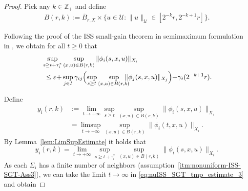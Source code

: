 \documentclass[twocolumn]{IEEEtran} %
\theoremstyle{definition}
\newcommand{\tm}{\times}%
\newcommand{\Uc}{\mathcal{U}}%
\newcommand{\ep}{\varepsilon}%
\newcommand{\Z}{\mathbb{Z}}%
\begin{document}
\begin{proof}
Pick any $k \in \Z_+$ and define 
\begin{eqnarray}
B(r,k) := \overline{B}_{r,X} \tm \{ u \in \Uc : \|u\|_{\Uc} \in [2^{-k}r,2^{-k+1}r]\}.
\label{eq:B(r,k)-definition}
\end{eqnarray} 

Following the proof of the ISS small-gain theorem in semimaximum formulation in \cite{MKG20}, we obtain for all $t \geq 0$ that%
\begin{align}
\label{eq:nuISS_SGT_tmp_estimate_3}
  &\sup_{s \geq t + \tau^*_i}\sup_{(x,u) \in B(r,k)} \|\phi_i(s,x,u)\|_{X_i} \nonumber\\
	&\  \leq \ep {+} \sup_{j \in I} \gamma_{ij}\Bigl(\sup_{s \geq t} \sup_{(x,u) \in B(r,k)} \hspace{-3mm}\|\phi_j(s,x,u)\|_{X_j}\Bigr) {+} \gamma_i(2^{-k+1}r).%
\end{align}


Define%
\begin{align*}
  y_i(r,k) &:= \lim_{t\to +\infty}\sup_{s\geq t}\sup_{(x,u)\in B(r,k)}\|\phi_i(s,x,u)\|_{X_i}\\
           &= \limsup_{t\to +\infty}\sup_{(x,u)\in B(r,k)}\|\phi_i(t,x,u)\|_{X_i}.%
\end{align*}
By Lemma~\ref{lem:LimSupEstimate} it holds that%
\begin{equation*}
  y_i(r,k) = \lim_{t\to +\infty}\sup_{s\geq t +\tau^*_i}\sup_{(x,u)\in B(r,k)}\|\phi_i(s,x,u)\|_{X_i}.%
\end{equation*}
As each $\Sigma_i$ has a finite number of neighbors (assumption~\ref{itm:nonuniform-ISS-SGT-Ass3}), we can take the limit $t\to\infty$ in \eqref{eq:nuISS_SGT_tmp_estimate_3} and obtain%


\end{proof}
\end{document}

